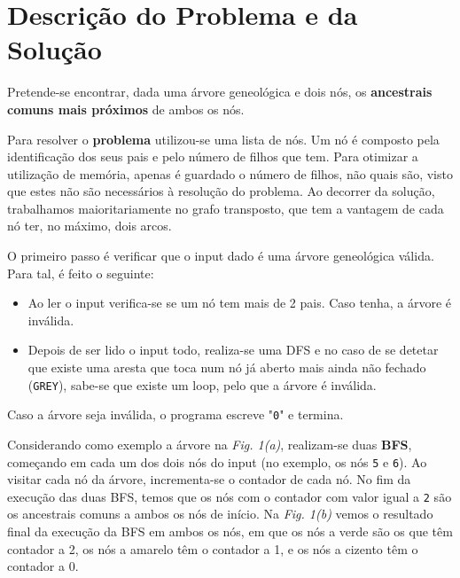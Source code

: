 \documentclass[12pt,a4paper]{article}
\begin{document}
  \section{Descrição do Problema e da Solução}

  Pretende-se encontrar, dada uma árvore geneológica e dois nós, os \textbf{ancestrais comuns mais próximos} de ambos os nós.

  Para resolver o \textbf{problema} utilizou-se uma lista de nós.
  Um nó é composto pela identificação dos seus pais e pelo número de filhos que tem.
  Para otimizar a utilização de memória, apenas é guardado o número de filhos, não quais são, visto que estes não são necessários à resolução do problema.
  Ao decorrer da solução, trabalhamos maioritariamente no grafo transposto, que tem a vantagem de cada nó ter, no máximo, dois arcos.

  O primeiro passo é verificar que o input dado é uma árvore geneológica válida.
  Para tal, é feito o seguinte:
  
  \begin{itemize}
    \setlength{\itemsep}{0pt}
      \item Ao ler o input verifica-se se um nó tem mais de 2 pais. Caso tenha, a árvore é inválida.
      \item Depois de ser lido o input todo, realiza-se uma DFS e no caso de se detetar que existe uma aresta que toca num nó já aberto mais ainda não fechado (\texttt{GREY}), sabe-se que existe um loop, pelo que a árvore é inválida.
  \end{itemize}

  Caso a árvore seja inválida, o programa escreve "\texttt{0}" e termina.

  Considerando como exemplo a árvore na \textit{Fig. 1(a)}, realizam-se duas \textbf{BFS}, começando em cada um dos dois nós do input (no exemplo, os nós \texttt{5} e \texttt{6}).
  Ao visitar cada nó da árvore, incrementa-se o contador de cada nó.
  No fim da execução das duas BFS, temos que os nós com o contador com valor igual a \texttt{2} são os ancestrais comuns a ambos os nós de início.
  Na \textit{Fig. 1(b)} vemos o resultado final da execução da BFS em ambos os nós, em que os nós a verde são os que têm contador a 2, os nós a amarelo têm o contador a 1, e os nós a cizento têm o contador a 0.
\end{document}

